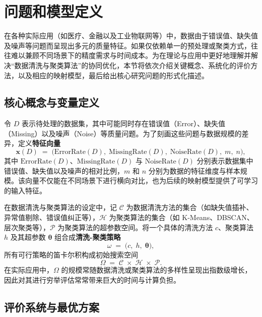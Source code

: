 \documentclass[8pt]{article} %
\numberwithin{equation}{section}
\begin{document}
\section{问题和模型定义}
\label{sec:problem-and-model}

在各种实际应用（如医疗、金融以及工业物联网等）中，数据由于错误值、缺失值及噪声等问题而呈现出多元的质量特征。如果仅依赖单一的预处理或聚类方式，往往难以兼顾不同场景下的精度需求与时间成本。为在理论与应用中更好地理解并解决“数据清洗与聚类算法”的协同优化，本节将依次介绍关键概念、系统化的评价方法，以及相应的映射模型，最后给出核心研究问题的形式化描述。

\subsection{核心概念与变量定义}
\label{subsec:core-concepts}

令 \(D\) 表示待处理的数据集，其中可能同时存在错误值（Error）、缺失值（Missing）以及噪声（Noise）等质量问题。为了刻画这些问题与数据规模的差异，定义\textbf{特征向量}
\begin{equation}\label{eq:xD}
  \mathbf{x}(D) 
  \;=\; 
  \bigl(\mathrm{ErrorRate}(D),\; \mathrm{MissingRate}(D),\; \mathrm{NoiseRate}(D),\; m,\; n\bigr),
\end{equation}
其中 \(\mathrm{ErrorRate}(D)\)、\(\mathrm{MissingRate}(D)\) 与 \(\mathrm{NoiseRate}(D)\) 分别表示数据集中错误值、缺失值以及噪声的相对比例，\(m\) 和 \(n\) 分别为数据的特征维度与样本规模。该向量不仅能在不同场景下进行横向对比，也为后续的映射模型提供了可学习的输入特征。

在数据清洗与聚类算法的设定中，记 \(\mathcal{C}\) 为数据清洗方法的集合（如缺失值插补、异常值剔除、错误值纠正等），\(\mathcal{H}\) 为聚类算法的集合（如 K-Means、DBSCAN、层次聚类等），\(\mathcal{P}\) 为聚类算法的超参数空间。将一个具体的清洗方法 \(c\)、聚类算法 \(h\) 及其超参数 \(\boldsymbol{\theta}\) 组合成\textbf{清洗-聚类策略}
\begin{equation}\label{eq:omega}
  \omega 
  \;=\; 
  \bigl(c,\; h,\; \boldsymbol{\theta}\bigr),
\end{equation}
所有可行策略的笛卡尔积构成初始搜索空间
\begin{equation}\label{eq:Omega}
  \Omega 
  \;=\; 
  \mathcal{C} \;\times\; \mathcal{H} \;\times\; \mathcal{P}.
\end{equation}
在实际应用中，\(\Omega\) 的规模常随数据清洗或聚类算法的多样性呈现出指数级增长，因此对其进行穷举评估常常带来巨大的时间与计算负担。

\subsection{评价系统与最优方案}
\label{subsec:evaluation-system}
\end{document}
